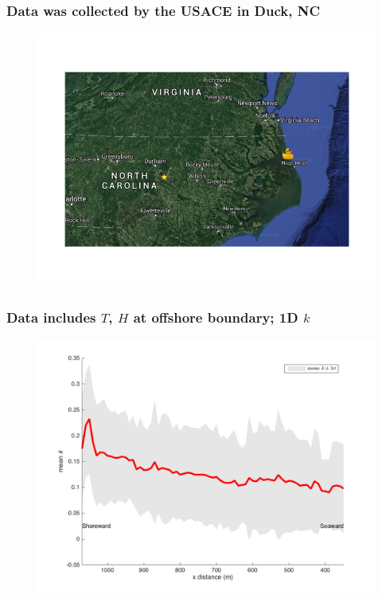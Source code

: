 \documentclass[7pt]{beamer}
\begin{document}
\begin{frame}
	\frametitle{Data was collected by the  USACE in Duck, NC}
		 \centering
		 \begin{figure}
       			 \includegraphics[width=1\linewidth]{img/map_ncsu_duck.png}
       		 \end{figure}
\end{frame}

\begin{frame}
	\frametitle{Data includes $T$, $H$ at offshore boundary; 1D $k$}
		\begin{figure}[H]
			\centering
			\includegraphics[width=1\linewidth]{img/k1Dmean_std.png}
		\end{figure}
\end{frame}
\end{document}
